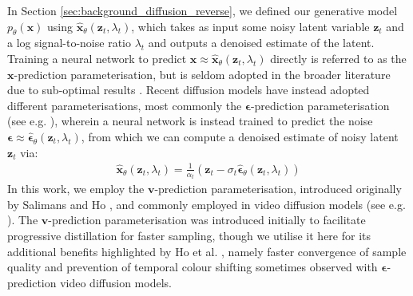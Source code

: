 \documentclass[ oneside,%
                    author={George Herbert},
                    degree={MSci},
                     title={Video Diffusion Models for Climate Simulations},
                  subtitle={}]{dissertation}
\begin{document}
In Section \ref{sec:background_diffusion_reverse}, we defined our generative model $p_\theta(\mathbf{x})$ using $\hat{\mathbf{x}}_\theta(\mathbf{z}_t,\lambda_t)$, which takes as input some noisy latent variable $\mathbf{z}_t$ and a log signal-to-noise ratio $\lambda_t$ and outputs a denoised estimate of the latent. Training a neural network to predict $\mathbf{x}\approx\hat{\mathbf{x}}_\theta(\mathbf{z}_t, \lambda_t)$ directly is referred to as the $\mathbf{x}$-prediction parameterisation, but is seldom adopted in the broader literature due to sub-optimal results \cite{DDPM_Ho}. Recent diffusion models have instead adopted different parameterisations, most commonly the $\boldsymbol\epsilon$-prediction parameterisation (see e.g. \cite{DDPM_Ho,Cascaded_Ho,Imagen_Saharia}), wherein a neural network is instead trained to predict the noise $\boldsymbol\epsilon\approx\hat{\boldsymbol\epsilon}_\theta(\mathbf{z}_t,\lambda_t)$, from which we can compute a denoised estimate of noisy latent $\mathbf{z}_t$ via:
\begin{align}
      \hat{\mathbf{x}}_\theta(\mathbf{z}_t,\lambda_t)=\frac{1}{\alpha_t}\left(\mathbf{z}_t-\sigma_t\hat{\boldsymbol\epsilon}_\theta(\mathbf{z}_t, \lambda_t)\right)
\end{align}
In this work, we employ the $\mathbf{v}$-prediction parameterisation, introduced originally by Salimans and Ho \cite{Progressive_Distillation_Salimans}, and commonly employed in video diffusion models (see e.g. \cite{VDM_Ho,Imagen_Video_Ho}). The $\mathbf{v}$-prediction parameterisation was introduced initially to facilitate progressive distillation for faster sampling, though we utilise it here for its additional benefits highlighted by Ho et al. \cite{Imagen_Video_Ho}, namely faster convergence of sample quality and prevention of temporal colour shifting sometimes observed with $\boldsymbol\epsilon$-prediction video diffusion models. 
\end{document}
